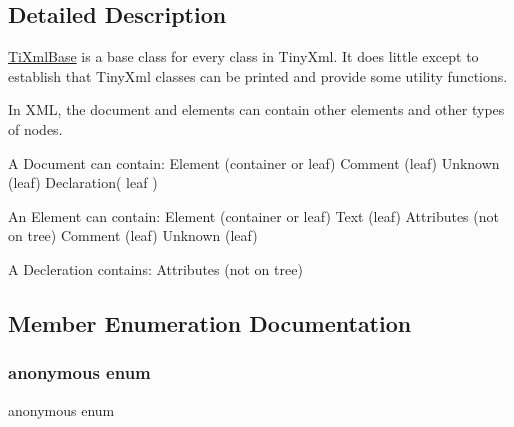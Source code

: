 \subsection{Detailed Description}
\hyperlink{class_ti_xml_base}{Ti\+Xml\+Base} is a base class for every class in Tiny\+Xml. It does little except to establish that Tiny\+Xml classes can be printed and provide some utility functions.

In X\+ML, the document and elements can contain other elements and other types of nodes.

\begin{DoxyVerb}A Document can contain: Element (container or leaf)
                        Comment (leaf)
                        Unknown (leaf)
                        Declaration( leaf )

An Element can contain: Element (container or leaf)
                        Text    (leaf)
                        Attributes (not on tree)
                        Comment (leaf)
                        Unknown (leaf)

A Decleration contains: Attributes (not on tree)
\end{DoxyVerb}
 

\subsection{Member Enumeration Documentation}
\mbox{\label{class_ti_xml_base_a9a7e9344415956ab96e8c75f6a0bbd48}} 
\subsubsection{\texorpdfstring{anonymous enum}{anonymous enum}}
{\footnotesize\ttfamily anonymous enum}

